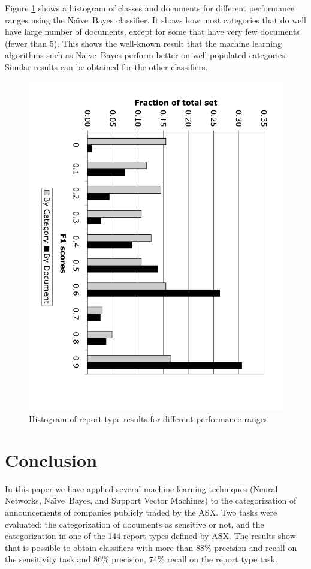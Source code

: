 \documentclass[twocolumn]{article}
\newcommand{\naive}{Na\"\i ve}
\begin{document}
Figure \ref{histogram} shows a histogram of classes and documents for
different performance ranges using the \naive\ Bayes classifier. It
shows how most categories that do well have large number of documents,
except for some that have very few documents (fewer than 5). This
shows the well-known result that the machine learning algorithms such
as \naive\ Bayes perform better on well-populated
categories. Similar results can be obtained for the other classifiers.


\begin{figure}
\includegraphics[angle=90,width=\linewidth]{results}
\caption{Histogram of report type results for different performance ranges}
\label{histogram}
\end{figure}

\section{Conclusion}
\label{conclusion}


In this paper we have applied several machine learning techniques
(Neural Networks, \naive\ Bayes, and Support Vector Machines) to the
categorization of announcements of companies publicly traded by the
ASX.  Two tasks were evaluated: the categorization of documents as
sensitive or not, and the categorization in one of the 144 report
types defined by ASX. The results show that is possible to obtain
classifiers with more than 88\% precision and recall on the
sensitivity task and 86\% precision, 74\% recall on the report type
task.
\end{document}
